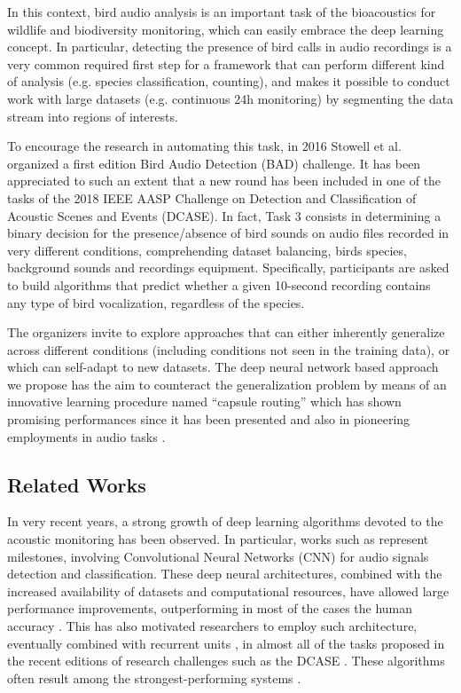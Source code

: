 In this context, bird audio analysis is an important task of the bioacoustics for wildlife and biodiversity monitoring, which can easily embrace the deep learning concept.
In particular, detecting the presence of bird calls in audio recordings is a very common required first step for a framework that can perform different kind of  analysis (e.g. species classification, counting), and makes it possible to conduct work with large datasets (e.g. continuous 24h monitoring) by segmenting the data stream into regions of interests.

To encourage the research in automating this task, in 2016 Stowell et al. \cite{stowell2016bird} organized a first edition Bird Audio Detection (BAD) challenge. It has been appreciated to such an extent that a new round has been included in one of the tasks of the 2018 IEEE AASP Challenge on Detection and Classification of Acoustic Scenes and Events (DCASE). In fact, Task 3 consists  in determining a binary decision for the presence/absence of bird sounds on audio files recorded in very different conditions, comprehending dataset balancing, birds species, background sounds and recordings equipment.
Specifically, participants are asked to build algorithms that predict whether a given 10-second recording contains any type of bird vocalization, regardless of the species. 

The organizers invite to explore approaches that can either inherently generalize across different conditions (including conditions not seen in the training data), or which can self-adapt to new datasets. The deep neural network based approach we propose has the aim to counteract the generalization problem by means of an innovative learning procedure named ``capsule routing'' which has shown promising performances since it has been presented \cite{sabour2017dynamic} and also in pioneering employments in audio tasks \cite{iqbal2018capsule}.



\subsection{Related Works}
\label{ssec:related}


In very recent years, a strong growth of deep learning algorithms devoted to the acoustic monitoring has been observed. In particular, works such as \cite{mcloughlin2015low, piczak2015environmental, salamon2017deep} represent milestones, involving Convolutional Neural Networks (CNN) for audio signals detection and classification.
These deep neural architectures, combined with the increased availability of datasets and computational resources, have allowed large performance improvements, outperforming in most of the cases the human accuracy \cite{sailor2017unsupervised}. This has also motivated researchers to employ such architecture, eventually combined with recurrent units \cite{cakir2017convolutional}, in almost all of the tasks proposed in the recent editions of research challenges such as the DCASE \cite{DCASE2017challenge}. These algorithms often result among the strongest-performing systems \cite{limrare, valenti2017convolutional}.

